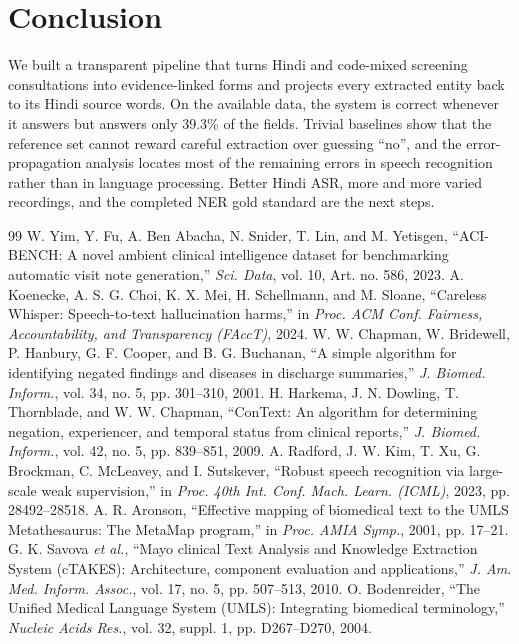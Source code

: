 \documentclass[conference]{IEEEtran}
\begin{document}
\section{Conclusion}
We built a transparent pipeline that turns Hindi and code-mixed screening consultations into evidence-linked forms and projects every extracted entity back to its Hindi source words. On the available data, the system is correct whenever it answers but answers only 39.3\% of the fields. Trivial baselines show that the reference set cannot reward careful extraction over guessing “no”, and the error-propagation analysis locates most of the remaining errors in speech recognition rather than in language processing. Better Hindi ASR, more and more varied recordings, and the completed NER gold standard are the next steps.

\begin{thebibliography}{99}
 W. Yim, Y. Fu, A. Ben Abacha, N. Snider, T. Lin, and M. Yetisgen, “ACI-BENCH: A novel ambient clinical intelligence dataset for benchmarking automatic visit note generation,” \emph{Sci. Data}, vol. 10, Art. no. 586, 2023.
 A. Koenecke, A. S. G. Choi, K. X. Mei, H. Schellmann, and M. Sloane, “Careless Whisper: Speech-to-text hallucination harms,” in \emph{Proc. ACM Conf. Fairness, Accountability, and Transparency (FAccT)}, 2024.
 W. W. Chapman, W. Bridewell, P. Hanbury, G. F. Cooper, and B. G. Buchanan, “A simple algorithm for identifying negated findings and diseases in discharge summaries,” \emph{J. Biomed. Inform.}, vol. 34, no. 5, pp. 301–310, 2001.
 H. Harkema, J. N. Dowling, T. Thornblade, and W. W. Chapman, “ConText: An algorithm for determining negation, experiencer, and temporal status from clinical reports,” \emph{J. Biomed. Inform.}, vol. 42, no. 5, pp. 839–851, 2009.
 A. Radford, J. W. Kim, T. Xu, G. Brockman, C. McLeavey, and I. Sutskever, “Robust speech recognition via large-scale weak supervision,” in \emph{Proc. 40th Int. Conf. Mach. Learn. (ICML)}, 2023, pp. 28492–28518.
 A. R. Aronson, “Effective mapping of biomedical text to the UMLS Metathesaurus: The MetaMap program,” in \emph{Proc. AMIA Symp.}, 2001, pp. 17–21.
 G. K. Savova \emph{et al.}, “Mayo clinical Text Analysis and Knowledge Extraction System (cTAKES): Architecture, component evaluation and applications,” \emph{J. Am. Med. Inform. Assoc.}, vol. 17, no. 5, pp. 507–513, 2010.
 O. Bodenreider, “The Unified Medical Language System (UMLS): Integrating biomedical terminology,” \emph{Nucleic Acids Res.}, vol. 32, suppl. 1, pp. D267–D270, 2004.

\end{thebibliography}
\end{document}
